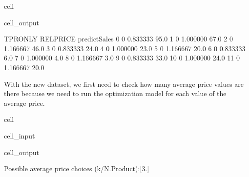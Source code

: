 \documentclass[letterpaper,10pt,english]{jupyterBook}
\begin{document}
\begin{sphinxuseclass}{cell}
\begin{sphinxVerbatimOutput}
\begin{sphinxuseclass}{cell_output}
\begin{sphinxVerbatim}[commandchars=\\\{\}]
    TPR\PYGZus{}ONLY  RELPRICE  predictSales  
0          0  0.833333          95.0  
1          0  1.000000          67.0  
2          0  1.166667          46.0  
3          0  0.833333          24.0  
4          0  1.000000          23.0  
5          0  1.166667          20.0  
6          0  0.833333           6.0  
7          0  1.000000           4.0  
8          0  1.166667           3.0  
9          0  0.833333          33.0  
10         0  1.000000          24.0  
11         0  1.166667          20.0  
\end{sphinxVerbatim}

\end{sphinxuseclass}\end{sphinxVerbatimOutput}

\end{sphinxuseclass}
\sphinxAtStartPar
With the new dataset, we first need to check how many average price values are there because we need to run the optimization model for each value of the average price.

\begin{sphinxuseclass}{cell}\begin{sphinxVerbatimInput}

\begin{sphinxuseclass}{cell_input}
\begin{sphinxVerbatim}[commandchars=\\\{\}]
  \PYG{p}{[}\PYG{p}{]}
  \PYG{p}{[}  \PYG{p}{]}
\end{sphinxVerbatim}

\end{sphinxuseclass}\end{sphinxVerbatimInput}
\begin{sphinxVerbatimOutput}

\begin{sphinxuseclass}{cell_output}
\begin{sphinxVerbatim}[commandchars=\\\{\}]
Possible average price choices (k/N.Product):[3.]
\end{sphinxVerbatim}

\end{sphinxuseclass}\end{sphinxVerbatimOutput}

\end{sphinxuseclass}
\end{document}

